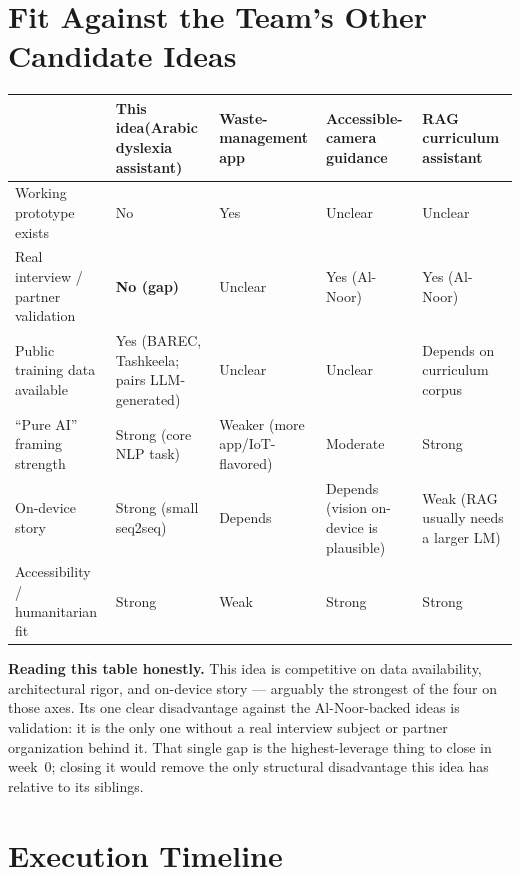 \documentclass[11pt,a4paper]{article}
\begin{document}
\newpage
\section{Fit Against the Team's Other Candidate Ideas}

\begin{center}
\small
\begin{tabular}{@{}p{3.6cm}p{2.6cm}p{2.6cm}p{2.6cm}p{2.6cm}@{}}
\toprule
& \textbf{This idea}\newline(Arabic dyslexia assistant) & \textbf{Waste-management app} & \textbf{Accessible-camera guidance} & \textbf{RAG curriculum assistant} \\
\midrule
Working prototype exists & No & Yes & Unclear & Unclear \\
Real interview / partner validation & \textbf{No (gap)} & Unclear & Yes (Al-Noor) & Yes (Al-Noor) \\
Public training data available & Yes (BAREC, Tashkeela; pairs LLM-generated) & Unclear & Unclear & Depends on curriculum corpus \\
``Pure AI'' framing strength & Strong (core NLP task) & Weaker (more app/IoT-flavored) & Moderate & Strong \\
On-device story & Strong (small seq2seq) & Depends & Depends (vision on-device is plausible) & Weak (RAG usually needs a larger LM) \\
Accessibility / humanitarian fit & Strong & Weak & Strong & Strong \\
\bottomrule
\end{tabular}
\end{center}

\begin{noteb}
\textbf{Reading this table honestly.} This idea is competitive on data
availability, architectural rigor, and on-device story --- arguably the
strongest of the four on those axes. Its one clear disadvantage against the
Al-Noor-backed ideas is validation: it is the only one without a real interview
subject or partner organization behind it. That single gap is the highest-leverage
thing to close in week~0; closing it would remove the only structural
disadvantage this idea has relative to its siblings.
\end{noteb}

\newpage
\section{Execution Timeline}
\end{document}
